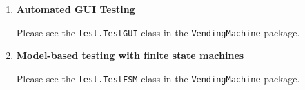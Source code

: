 \documentclass{report}
\begin{document}
\begin{enumerate}
	\item \textbf{Automated GUI Testing}
	
	Please see the \texttt{test.TestGUI} class in the \texttt{VendingMachine} package.
	
	\item \textbf{Model-based testing with finite state machines}
	
	Please see the \texttt{test.TestFSM} class in the \texttt{VendingMachine} package.
	
\end{enumerate}
\end{document}
